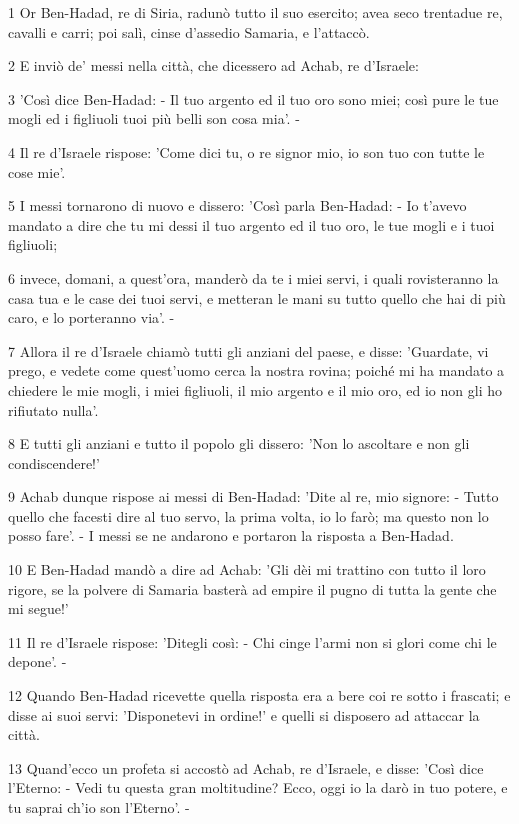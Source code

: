 \par 1 Or Ben-Hadad, re di Siria, radunò tutto il suo esercito; avea seco trentadue re, cavalli e carri; poi salì, cinse d'assedio Samaria, e l'attaccò.
\par 2 E inviò de' messi nella città, che dicessero ad Achab, re d'Israele:
\par 3 'Così dice Ben-Hadad: - Il tuo argento ed il tuo oro sono miei; così pure le tue mogli ed i figliuoli tuoi più belli son cosa mia'. -
\par 4 Il re d'Israele rispose: 'Come dici tu, o re signor mio, io son tuo con tutte le cose mie'.
\par 5 I messi tornarono di nuovo e dissero: 'Così parla Ben-Hadad: - Io t'avevo mandato a dire che tu mi dessi il tuo argento ed il tuo oro, le tue mogli e i tuoi figliuoli;
\par 6 invece, domani, a quest'ora, manderò da te i miei servi, i quali rovisteranno la casa tua e le case dei tuoi servi, e metteran le mani su tutto quello che hai di più caro, e lo porteranno via'. -
\par 7 Allora il re d'Israele chiamò tutti gli anziani del paese, e disse: 'Guardate, vi prego, e vedete come quest'uomo cerca la nostra rovina; poiché mi ha mandato a chiedere le mie mogli, i miei figliuoli, il mio argento e il mio oro, ed io non gli ho rifiutato nulla'.
\par 8 E tutti gli anziani e tutto il popolo gli dissero: 'Non lo ascoltare e non gli condiscendere!'
\par 9 Achab dunque rispose ai messi di Ben-Hadad: 'Dite al re, mio signore: - Tutto quello che facesti dire al tuo servo, la prima volta, io lo farò; ma questo non lo posso fare'. - I messi se ne andarono e portaron la risposta a Ben-Hadad.
\par 10 E Ben-Hadad mandò a dire ad Achab: 'Gli dèi mi trattino con tutto il loro rigore, se la polvere di Samaria basterà ad empire il pugno di tutta la gente che mi segue!'
\par 11 Il re d'Israele rispose: 'Ditegli così: - Chi cinge l'armi non si glori come chi le depone'. -
\par 12 Quando Ben-Hadad ricevette quella risposta era a bere coi re sotto i frascati; e disse ai suoi servi: 'Disponetevi in ordine!' e quelli si disposero ad attaccar la città.
\par 13 Quand'ecco un profeta si accostò ad Achab, re d'Israele, e disse: 'Così dice l'Eterno: - Vedi tu questa gran moltitudine? Ecco, oggi io la darò in tuo potere, e tu saprai ch'io son l'Eterno'. -
